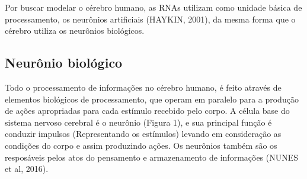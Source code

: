 Por buscar modelar o cérebro humano, as RNAs utilizam como unidade básica de processamento, os neurônios artificiais (HAYKIN, 2001), da mesma forma que o cérebro utiliza os neurônios biológicos. %



\subsection{Neurônio biológico}


Todo o processamento de informações no cérebro humano, é feito através de elementos biológicos de processamento, que operam em paralelo para a produção de ações apropriadas para cada estímulo recebido pelo corpo. A célula base do sistema nervoso cerebral é o neurônio (Figura 1), e sua principal função é conduzir impulsos (Representando os estímulos) levando em consideração as condições do corpo e assim produzindo ações. Os neurônios também são os resposáveis pelos atos do pensamento e armazenamento de informações (NUNES et al, 2016).

